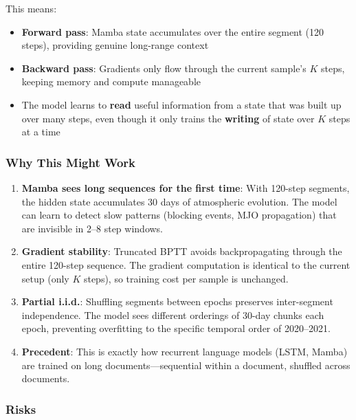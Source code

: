 \documentclass[11pt,a4paper]{article}
\begin{document}
This means:
\begin{itemize}[nosep]
  \item \textbf{Forward pass}: Mamba state accumulates over the entire segment (120 steps), providing genuine long-range context
  \item \textbf{Backward pass}: Gradients only flow through the current sample's $K$ steps, keeping memory and compute manageable
  \item The model learns to \textbf{read} useful information from a state that was built up over many steps, even though it only trains the \textbf{writing} of state over $K$ steps at a time
\end{itemize}

\subsubsection{Why This Might Work}

\begin{enumerate}
  \item \textbf{Mamba sees long sequences for the first time}: With 120-step segments, the hidden state accumulates 30 days of atmospheric evolution. The model can learn to detect slow patterns (blocking events, MJO propagation) that are invisible in 2--8 step windows.

  \item \textbf{Gradient stability}: Truncated BPTT avoids backpropagating through the entire 120-step sequence. The gradient computation is identical to the current setup (only $K$ steps), so training cost per sample is unchanged.

  \item \textbf{Partial i.i.d.}: Shuffling segments between epochs preserves inter-segment independence. The model sees different orderings of 30-day chunks each epoch, preventing overfitting to the specific temporal order of 2020--2021.

  \item \textbf{Precedent}: This is exactly how recurrent language models (LSTM, Mamba) are trained on long documents---sequential within a document, shuffled across documents.
\end{enumerate}

\subsubsection{Risks}
\end{document}
